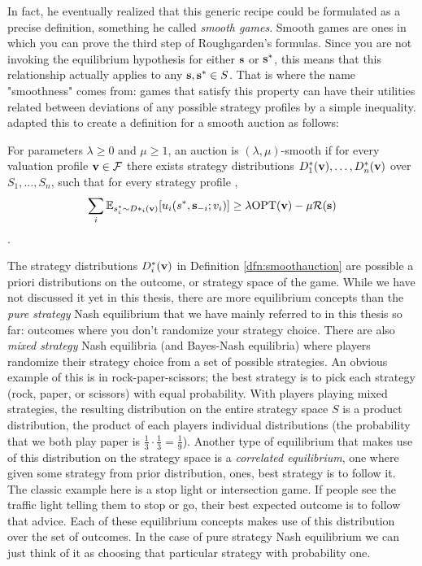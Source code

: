 \documentclass[12pt,twoside]{reedthesis}
\begin{document}
 In fact, he eventually realized that this generic recipe could be formulated as a precise definition, something he called {\em smooth games}. Smooth games are ones in which you can prove the third step of Roughgarden's formulas. Since you are not invoking the equilibrium hypothesis for either $\textbf{s}$ or $\textbf{s}^*$, this means that this relationship actually applies to any $\textbf{s},\textbf{s}^* \in S$. That is where the name "smoothness" comes from: games that satisfy this property can have their utilities related between deviations of any possible strategy profiles by a simple inequality. \cite{Syrgkanis2013} adapted this to create a definition for a smooth auction as follows:
\begin{dfn}
	For parameters $\lambda \geq 0$ and $\mu \geq 1$, an auction is $(\lambda, \mu)$-smooth if for every valuation profile $\textbf{v} \in \mathcal{F}$ there exists strategy distributions $D^*_1(\textbf{v}), \ldots, D^*_n(\textbf{v})$ over $S_1 , \ldots , S_n$, such that for every strategy profile \strategies,
	$$ \sum_i \mathbb{E}_{s^*_i \sim D*_i(\textbf{v})}[u_i(s^*, \textbf{s}_{-i};v_i)] \geq \lambda \text{OPT}(\textbf{v}) - \mu \mathcal{R}(\textbf{s})$$.
	\label{dfn:smoothauction}
\end{dfn}
The strategy distributions $D^*_i(\textbf{v})$ in Definition \ref{dfn:smoothauction} are possible a priori distributions on the outcome, or strategy space of the game. While we have not discussed it yet in this thesis, there are more equilibrium concepts than the {\em pure strategy} Nash equilibrium that we have mainly referred to in this thesis so far: outcomes where you don't randomize your strategy choice. There are also {\em mixed strategy} Nash equilibria (and Bayes-Nash equilibria) where players randomize their strategy choice from a set of possible strategies. An obvious example of this is in rock-paper-scissors; the best strategy is to pick each strategy (rock, paper, or scissors) with equal probability. With players playing mixed strategies, the resulting distribution on the entire strategy space $S$ is a product distribution, the product of each players individual distributions (the probability that we both play paper is $\frac{1}{3} \cdot \frac{1}{3} = \frac{1}{9}$). Another type of equilibrium that makes use of this distribution on the strategy space is a {\em correlated equilibrium}, one where given some strategy from prior distribution, ones, best strategy is to follow it. The classic example here is a stop light or intersection game. If people see the traffic light telling them to stop or go, their best expected outcome is to follow that advice. Each of these equilibrium concepts makes use of this distribution over the set of outcomes. In the case of pure strategy Nash equilibrium we can just think of it as choosing that particular strategy with probability one.
\end{document}
